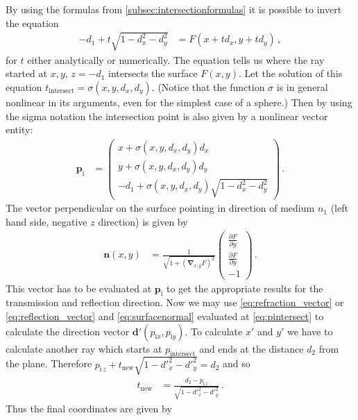 \documentclass[12pt,a4paper,twoside,openright,BCOR10mm,headsepline,titlepage,abstracton,chapterprefix,final]{scrreprt}
\newcommand\Vector[1]{{\mathbf{#1}}}
\begin{document}
By using the formulas from \ref{subsec:intersectionformulas} it is possible to invert the equation 
\begin{align}
-d_1 + t \sqrt{1-d_x^2-d_y^2} &= F(x + t d_x, y + t d_y)\,,\label{eq:genintersection} 
\end{align}
for $t$ either analytically or numerically. The equation tells
us where the ray started at $x, y$, $z = -d_1$ intersects the surface $F(x, y)$. Let the solution
of this equation $t_\text{intersect} = \sigma(x, y, d_x, d_y)$. (Notice that the function $\sigma$
is in general nonlinear in its arguments, even for the simplest case of a sphere.) Then by using the 
sigma notation the intersection point is also given by a nonlinear vector entity:
\begin{align}
 \Vector{p}_\text{i} &= \begin{pmatrix} x + \sigma(x,y,d_x,d_y) d_x \\ y + \sigma(x,y,d_x,d_y) d_y \\ -d_1 + \sigma(x,y,d_x,d_y) \sqrt{1 - d_x^2 - d_y^2} \end{pmatrix}\,.\label{eq:pintersect}
\end{align}
The vector perpendicular on the surface pointing in direction of medium $n_1$ (left hand side, negative $z$ direction) is given
by
\begin{align}
 \Vector{n}(x, y) &= 
  \frac{1}{\sqrt{1 + (\Vector{\nabla}_{x,y} F)^2}} 
  \begin{pmatrix} \frac{\partial F}{\partial y} \\ \frac{\partial F}{\partial y} \\ -1 \end{pmatrix}\,.\label{eq:surfacenormal}
\end{align}
This vector has to be evaluated at $\Vector{p}_\text{i}$ to get the appropriate results for
the transmission and reflection direction. Now we may use \eqref{eq:refraction_vector} or \eqref{eq:reflection_vector}
and \eqref{eq:surfacenormal} evaluated at \eqref{eq:pintersect} to calculate the direction vector $\Vector{d}'(p_{\text{i} x}, p_{\text{i} y})$.
To calculate $x'$ and $y'$ we have to calculate another ray which starts at $p_\text{intersect}$ and ends at the
distance $d_2$ from the plane. Therefore $p_{\text{i}\,z} + t_\text{new} \sqrt{1 - {d'}_x^2 - {d'}_y^2} = d_2$ and so
\begin{align}
t_\text{new} &= \frac{d_2 - p_{\text{i}\,z}}{\sqrt{1 - {d'}_x^2 - {d'}_y^2}}\,.
\end{align}
Thus the final coordinates are given by
\end{document}
